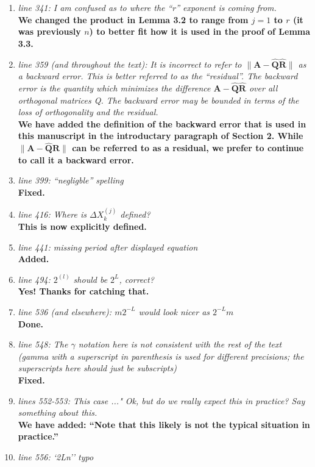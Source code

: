 \documentclass[final,onefignum,onetabnum]{siamart190516}
\newcommand{\bb}[1]{\mathbf{#1}}
\begin{document}
\begin{enumerate}
    {\bf Done. ($\tau$)}
    \item {\it line 341: I am confused as to where the ``r'' exponent is coming from. }\\
    {\bf We changed the product in Lemma 3.2 to range from $j=1$ to $r$ (it was previously $n$) to better fit how it is used in the proof of Lemma 3.3. }
    \item {\it line 359 (and throughout the text): It is incorrect to refer to $\|\bb{A}-\hat{\bb{Q}}\hat{\bb{R}}\|$ as a backward error. This is better referred to as the ``residual''. The backward error is the quantity which minimizes the difference $\bb{A}-\hat{\bb{Q}}\hat{\bb{R}}$ over all orthogonal matrices Q. The backward error may be bounded in terms of the loss of orthogonality and the residual. } \\
    {\bf We have added the definition of the backward error that is used in this manuscript in the introductary paragraph of Section 2. While $\|\bb{A}-\hat{\bb{Q}}\hat{\bb{R}}\|$ can be referred to as a residual, we prefer to continue to call it a backward error. }
    \item {\it line 399: ``negligble'' spelling }\\
    {\bf Fixed.}
    \item {\it line 416: Where is $\Delta X_k^{(j)}$ defined? }\\
    {\bf This is now explicitly defined.}
    \item {\it line 441: missing period after displayed equation }\\
    {\bf Added.}
    \item {\it line 494: $2^{(l)}$ should be $2^L$, correct? }\\
    {\bf Yes! Thanks for catching that.}
    \item {\it line 536 (and elsewhere): $m2^{-L}$ would look nicer as $2^{-L}m$ }\\
    {\bf Done.}
    \item {\it line 548: The $\gamma$ notation here is not consistent with the rest of the text (gamma with a superscript in parenthesis is used for different precisions; the superscripts here should just be subscripts) }\\
    {\bf Fixed.}
    \item {\it lines 552-553: This case ..." Ok, but do we really expect this in practice? Say something about this. }\\
    {\bf We have added: ``Note that this likely is not the typical situation in practice.'' }
    \item {\it line 556: `2Ln'' typo }\\

\end{enumerate}
\end{document}
